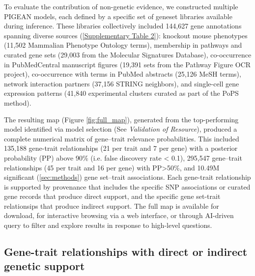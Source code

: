 \documentclass[sn-nature,lineno]{sn-jnl}%
\theoremstyle{thmstyleone}%
\theoremstyle{thmstyletwo}%
\theoremstyle{thmstylethree}%
\begin{document}
To evaluate the contribution of non-genetic evidence, we constructed multiple PIGEAN models, each defined by a specific set of geneset libraries available during inference. These libraries collectively included 144,627 gene annotations spanning diverse sources (\ref{Supplementary Table 2}): knockout mouse phenotypes (11,502 Mammalian Phenotype Ontology terms), membership in pathways and curated gene sets (29,003 from the Molecular Signatures Database), co-occurrence in PubMedCentral manuscript figures (19,391 sets from the Pathway Figure OCR project), co-occurrence with terms in PubMed abstracts (25,126 MeSH terms), network interaction partners (37,156 STRING neighbors), and single-cell gene expression patterns (41,840 experimental clusters curated as part of the PoPS method).  

The resulting map (Figure \ref{fig:full_map}), generated from the top-performing model identified via model selection (See \textit{Validation of Resource}), produced a complete numerical matrix of gene–trait relevance probabilities. This included 135,188 gene-trait relationships (21 per trait and 7 per gene) with a posterior probability (PP) above 90\% (i.e. false discovery rate < 0.1), 295,547 gene–trait relationships (45 per trait and 16 per gene) with PP>50\%, and 10.49M significant (\ref{sec:methods}) gene set–trait associations. Each gene-trait relationship is supported by provenance that includes the specific SNP associations or curated gene records  that produce direct support, and the specific gene set-trait relationsips that produce indirect support. The full map is available for download, for interactive browsing via a web interface, or through AI-driven query to filter and explore results in response to high-level questions.  

\subsection{Gene-trait relationships with direct or indirect genetic support}

\end{document}
